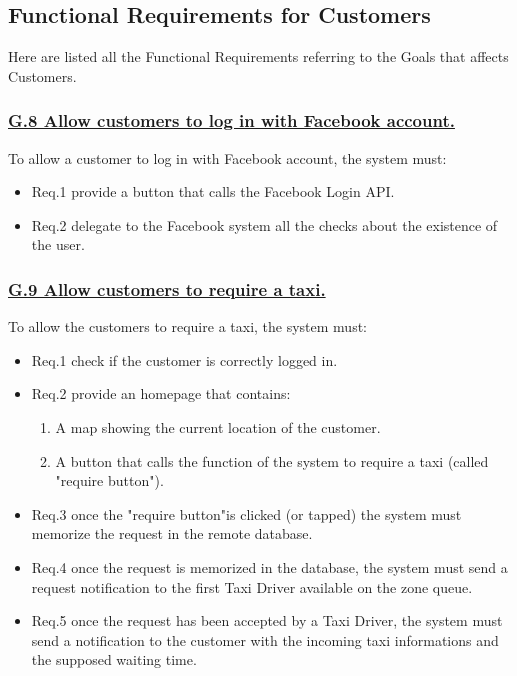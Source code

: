 		\subsection{Functional Requirements for Customers}
		Here are listed all the Functional Requirements referring to the Goals that affects Customers.

			\subsubsection{\lbrack \hyperref[sec:g8]{G.8 Allow customers to log in with Facebook account.}\rbrack}\label{sec:frs8}
			To allow a customer to log in with Facebook account, the system must:

				\begin{itemize}
					\item \lbrack Req.1\rbrack \label{sec:fr1_g8} provide a button that calls the Facebook Login API.
					\item \lbrack Req.2\rbrack \label{sec:fr2_g8} delegate to the Facebook system all the checks about the existence of the user.
				\end{itemize}

			\subsubsection{\lbrack \hyperref[sec:g9]{G.9 Allow customers to require a taxi.}\rbrack}\label{sec:frs9}
			To allow the customers to require a taxi, the system must:

				\begin{itemize}
					\item \lbrack Req.1\rbrack \label{sec:fr1_g9} check if the customer is correctly logged in.
					\item \lbrack Req.2\rbrack \label{sec:fr2_g9} provide an homepage that contains:
						\begin{enumerate}
							\item A map showing the current location of the customer.
							\item A button that calls the function of the system to require a taxi (called "require button").
						\end{enumerate}
					\item \lbrack Req.3\rbrack \label{sec:fr3_g9} once the "require button"is clicked (or tapped) the system must memorize the request in the remote database.
					\item \lbrack Req.4\rbrack \label{sec:fr4_g9} once the request is memorized in the database, the system must send a request notification to the first Taxi Driver available on the zone queue.
					\item \lbrack Req.5\rbrack \label{sec:fr5_g9} once the request has been accepted by a Taxi Driver, the system must send a notification to the customer with the incoming taxi informations and the supposed waiting time.
				\end{itemize}

